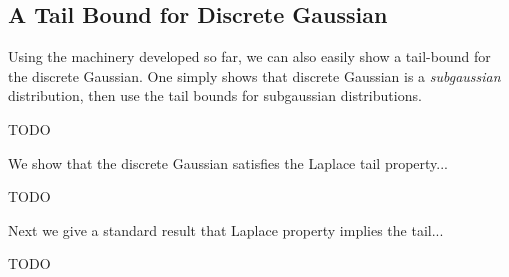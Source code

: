 \documentclass{article}
\begin{document}
\subsection{A Tail Bound for Discrete Gaussian}

Using the machinery developed so far,
we can also easily show a tail-bound for the discrete Gaussian.
One simply shows that discrete Gaussian is a \emph{subgaussian} distribution,
then use the tail bounds for subgaussian distributions.

\begin{definition}
	TODO
\end{definition}

We show that the discrete Gaussian satisfies the Laplace tail  property...
\begin{lemma}
	TODO
\end{lemma}

Next we give a standard result that Laplace property implies the tail...
\begin{lemma}
	TODO
\end{lemma}



\end{document}

